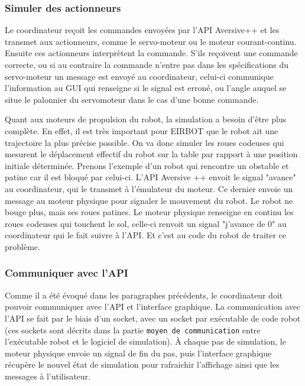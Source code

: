 \subsubsection{Simuler des actionneurs}
Le coordinateur reçoit les commandes envoyées par l'API Aversive++ et les transmet aux actionneurs, comme le servo-moteur ou le moteur courant-continu. Ensuite ces actionneurs interprètent la commande. S'ils reçoivent une commande correcte, ou si au contraire la commande n'entre pas dans les spécifications du servo-moteur un message est envoyé au coordinateur, celui-ci communique l'information au GUI qui renseigne si le signal est erroné, ou l'angle auquel se situe le palonnier du servomoteur dans le cas d'une bonne commande.

Quant aux moteurs de propulsion du robot, la simulation a besoin d'être plus complète. En effet, il est très important pour EIRBOT que le robot ait une trajectoire la plus précise possible.
On va donc simuler les roues codeuses qui mesurent le déplacement effectif du robot sur la table par rapport à une position initiale déterminée.
Prenons l'exemple d'un robot qui rencontre un obstable et patine car il est bloqué par celui-ci. L'API Aversive ++ envoit le signal "avance" au coordinateur, qui le transmet à l'émulateur du moteur. Ce dernier envoie un message au moteur physique pour signaler le mouvement du robot. Le robot ne bouge plus, mais ses roues patines. Le moteur physique renseigne en continu les roues codeuses qui touchent le sol, celle-ci renvoit un signal "j'avance de 0" au coordinateur qui le fait suivre à l'API. Et c'est au code du robot de traiter ce problème.

\subsubsection{Communiquer avec l'API}
Comme il a été évoqué dans les paragraphes précédents, le coordinateur doit pouvoir communiquer avec l'API et l'interface graphique. La communication avec l'API se fait par le biais d'un socket, avec un socket par exécutable de code robot (ces sockets sont décrits dans la partie \texttt{moyen de communication} entre l'exécutable robot et le logiciel de simulation). À chaque pas de simulation, le moteur physique envoie un signal de fin du pas, puis l'interface graphique récupère le nouvel état de simulation pour rafraichir l'affichage ainsi que les messages à l'utilisateur.
   
